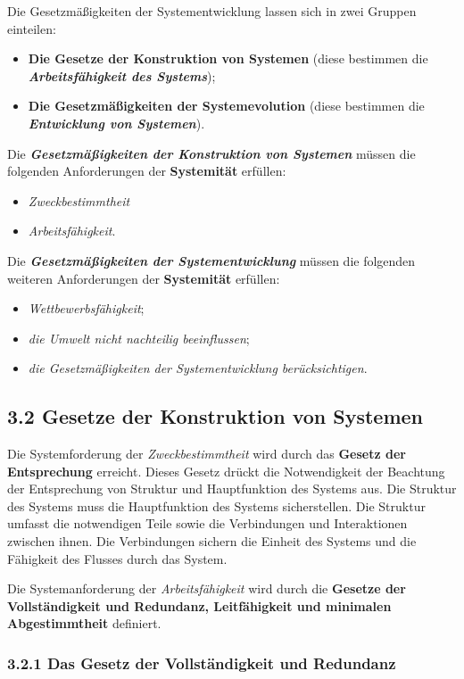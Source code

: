 \documentclass[11pt,a4paper]{article}
\begin{document}
Die Gesetzmäßigkeiten der Systementwicklung lassen sich in zwei Gruppen
einteilen: 
\begin{itemize}[noitemsep]
\item \textbf{Die Gesetze der Konstruktion von Systemen} (diese bestimmen die
  \textbf{\emph{Arbeitsfähig\-keit des Systems}});
\item \textbf{Die Gesetzmäßigkeiten der Systemevolution} (diese bestimmen die
  \textbf{\emph{Entwicklung von Systemen}}).
\end{itemize}
Die \textbf{\emph{Gesetzmäßigkeiten der Konstruktion von Systemen}} müssen die
folgenden Anforderungen der \textbf{Systemität} erfüllen:
\begin{itemize}[noitemsep]
\item \emph{Zweckbestimmtheit}
\item \emph{Arbeitsfähigkeit}.
\end{itemize}

Die \textbf{\emph{Gesetzmäßigkeiten der Systementwicklung}} müssen die
folgenden weiteren Anforderungen der \textbf{Systemität} erfüllen:
\begin{itemize}[noitemsep]
\item \emph{Wettbewerbsfähigkeit};
\item \emph{die Umwelt nicht nachteilig beeinflussen};
\item \emph{die Gesetzmäßigkeiten der Systementwicklung berücksichtigen}.
\end{itemize}

\subsection{3.2 Gesetze der Konstruktion von Systemen}

Die Systemforderung der \emph{Zweckbestimmtheit} wird durch das \textbf{Gesetz
  der Entsprechung} erreicht. Dieses Gesetz drückt die Notwendigkeit der
Beachtung der Entsprechung von Struktur und Hauptfunktion des Systems aus. Die
Struktur des Systems muss die Hauptfunktion des Systems sicherstellen.  Die
Struktur umfasst die notwendigen Teile sowie die Verbindungen und
Interaktionen zwischen ihnen.  Die Verbindungen sichern die Einheit des
Systems und die Fähigkeit des Flusses durch das System.

Die Systemanforderung der \emph{Arbeitsfähigkeit} wird durch die
\textbf{Gesetze der Vollständigkeit und Redundanz, Leitfähigkeit und minimalen
  Abgestimmtheit} definiert.

\subsubsection{3.2.1 Das Gesetz der Vollständigkeit und Redundanz}
\end{document}

